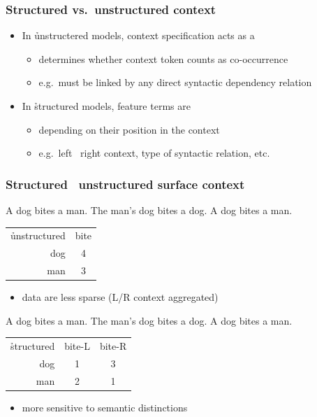 \documentclass[t]{beamer} %
\begin{document}
\begin{frame}[c]
  \frametitle{Structured vs.\ unstructured context}

  \begin{itemize}
  \item In \h{unstructered} models, context specification acts as a 
    \begin{itemize}
    \item determines whether context token counts as co-occurrence
    \item e.g.\ must be linked by any direct syntactic dependency relation
    \end{itemize}
    \gap
  \item<2-> In \h{structured} models, feature terms are 
    \begin{itemize}
    \item depending on their position in the context
    \item e.g.\ left \vs\ right context, type of syntactic relation, etc.
    \end{itemize}
  \end{itemize}
\end{frame}

\begin{frame}
  \frametitle{Structured \vs\ unstructured surface context}

  A dog bites a man. The man's dog bites a dog.  A dog bites a man.
  
 \begin{center}
    \begin{tabular}{r|c}
      \h{unstructured} &  bite \\
      dog & 4 \\
      man & 3 
    \end{tabular}
  \end{center}
  \begin{itemize}
  \item<3->[\So] data are less sparse (L/R context aggregated)
  \end{itemize}

  \gap[2]
  A dog bites a man. The man's dog bites a dog.  A dog bites a man.
  
  \begin{center}
    \begin{tabular}{r|c|c}
      \h{structured} &  bite-L & bite-R \\
      dog & 1 & 3 \\
      man & 2  & 1
    \end{tabular}
  \end{center}
  \begin{itemize}
  \item<3->[\So] more sensitive to semantic distinctions
  \end{itemize}
\end{frame}
\end{document}
